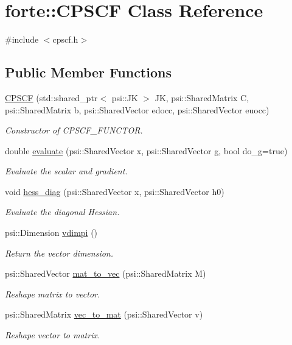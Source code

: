 \hypertarget{classforte_1_1_c_p_s_c_f}{}\section{forte\+:\+:C\+P\+S\+CF Class Reference}
\label{classforte_1_1_c_p_s_c_f}


{\ttfamily \#include $<$cpscf.\+h$>$}

\subsection*{Public Member Functions}
\begin{DoxyCompactItemize}
\item 
\mbox{\hyperlink{classforte_1_1_c_p_s_c_f_a4ca7f1d2db6b7ee422f779447592cff0}{C\+P\+S\+CF}} (std\+::shared\+\_\+ptr$<$ psi\+::\+JK $>$ JK, psi\+::\+Shared\+Matrix C, psi\+::\+Shared\+Matrix b, psi\+::\+Shared\+Vector edocc, psi\+::\+Shared\+Vector euocc)
\begin{DoxyCompactList}\small\item\em Constructor of C\+P\+S\+C\+F\+\_\+\+F\+U\+N\+C\+T\+OR. \end{DoxyCompactList}\item 
double \mbox{\hyperlink{classforte_1_1_c_p_s_c_f_ab111cda27e9bc9c8eb2f575ae89104e5}{evaluate}} (psi\+::\+Shared\+Vector x, psi\+::\+Shared\+Vector g, bool do\+\_\+g=true)
\begin{DoxyCompactList}\small\item\em Evaluate the scalar and gradient. \end{DoxyCompactList}\item 
void \mbox{\hyperlink{classforte_1_1_c_p_s_c_f_a974ab98e124651d3d3bc8b163a00286f}{hess\+\_\+diag}} (psi\+::\+Shared\+Vector x, psi\+::\+Shared\+Vector h0)
\begin{DoxyCompactList}\small\item\em Evaluate the diagonal Hessian. \end{DoxyCompactList}\item 
psi\+::\+Dimension \mbox{\hyperlink{classforte_1_1_c_p_s_c_f_ac5a426e6730351ff0a3639fec8931c16}{vdimpi}} ()
\begin{DoxyCompactList}\small\item\em Return the vector dimension. \end{DoxyCompactList}\item 
psi\+::\+Shared\+Vector \mbox{\hyperlink{classforte_1_1_c_p_s_c_f_a2fec329d9dbf17e1762e256cffd1dff8}{mat\+\_\+to\+\_\+vec}} (psi\+::\+Shared\+Matrix M)
\begin{DoxyCompactList}\small\item\em Reshape matrix to vector. \end{DoxyCompactList}\item 
psi\+::\+Shared\+Matrix \mbox{\hyperlink{classforte_1_1_c_p_s_c_f_ae8f08daaa75c9664d357f0245c334d9b}{vec\+\_\+to\+\_\+mat}} (psi\+::\+Shared\+Vector v)
\begin{DoxyCompactList}\small\item\em Reshape vector to matrix. \end{DoxyCompactList}\end{DoxyCompactItemize}


